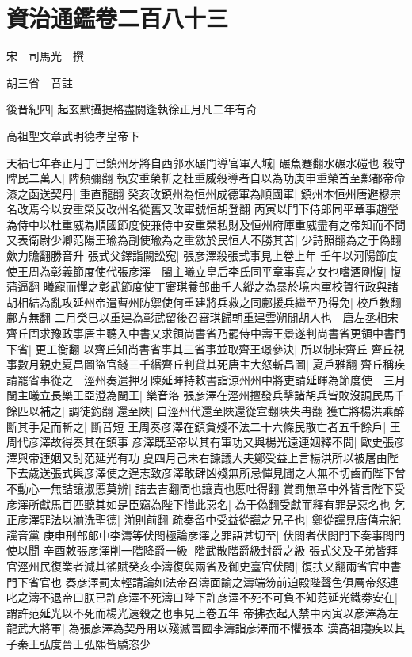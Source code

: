 \section{資治通鑑卷二百八十三}
宋　司馬光　撰

胡三省　音註

後晋紀四|{
	起玄黓攝提格盡閼逢執徐正月凡二年有奇}


高祖聖文章武明德孝皇帝下

天福七年春正月丁巳鎮州牙將自西郭水碾門導官軍入城|{
	碾魚蹇翻水碾水磑也}
殺守陴民二萬人|{
	陴頻彌翻}
執安重榮斬之杜重威殺導者自以為功庚申重榮首至鄴都帝命漆之函送契丹|{
	重直龍翻}
癸亥改鎮州為恒州成德軍為順國軍|{
	鎮州本恒州唐避穆宗名改焉今以安重榮反改州名從舊又改軍號恒胡登翻}
丙寅以門下侍郎同平章事趙瑩為侍中以杜重威為順國節度使兼侍中安重榮私財及恒州府庫重威盡有之帝知而不問又表衛尉少卿范陽王瑜為副使瑜為之重斂於民恒人不勝其苦|{
	少詩照翻為之于偽翻歛力贍翻勝音升}
張式父鐸詣闕訟寃|{
	張彦澤殺張式事見上卷上年}
壬午以河陽節度使王周為彰義節度使代張彦澤　閩主曦立皇后李氏同平章事真之女也嗜酒剛愎|{
	愎蒲逼翻}
曦寵而憚之彰武節度使丁審琪養部曲千人縱之為暴於境内軍校賀行政與諸胡相結為亂攻延州帝遣曹州防禦使何重建將兵救之同鄜援兵繼至乃得免|{
	校戶教翻鄜方無翻}
二月癸巳以重建為彰武留後召審琪歸朝重建雲朔閒胡人也　唐左丞相宋齊丘固求豫政事唐主聽入中書又求領尚書省乃罷侍中壽王景遂判尚書省更領中書門下省|{
	更工衡翻}
以齊丘知尚書省事其三省事並取齊王璟參決|{
	所以制宋齊丘}
齊丘視事數月親吏夏昌圖盜官錢三千緡齊丘判貸其死唐主大怒斬昌圖|{
	夏戶雅翻}
齊丘稱疾請罷省事從之　涇州奏遣押牙陳延暉持敕書詣涼州州中將吏請延暉為節度使　三月閩主曦立長樂王亞澄為閩王|{
	樂音洛}
張彦澤在涇州擅發兵擊諸胡兵皆敗沒調民馬千餘匹以補之|{
	調徒釣翻}
還至陜|{
	自涇州代還至陜還從宣翻陜失冉翻}
獲亡將楊洪乘醉斷其手足而斬之|{
	斷音短}
王周奏彦澤在鎮貪殘不法二十六條民散亡者五千餘戶|{
	王周代彦澤故得奏其在鎮事}
彦澤既至帝以其有軍功又與楊光遠連姻釋不問|{
	歐史張彦澤與帝連姻又討范延光有功}
夏四月己未右諫議大夫鄭受益上言楊洪所以被屠由陛下去歲送張式與彦澤使之逞志致彦澤敢肆凶殘無所忌憚見聞之人無不切齒而陛下曾不動心一無詰讓淑慝莫辨|{
	詰去吉翻問也讓責也慝吐得翻}
賞罰無章中外皆言陛下受彦澤所獻馬百匹聽其如是臣竊為陛下惜此惡名|{
	為于偽翻受獻而釋有罪是惡名也}
乞正彦澤罪法以湔洗聖德|{
	湔則前翻}
疏奏留中受益從讜之兄子也|{
	鄭從讜見唐僖宗紀讜音黨}
庚申刑部郎中李濤等伏閤極論彦澤之罪語甚切至|{
	伏閤者伏閤門下奏事閤門使以聞}
辛酉敕張彦澤削一階降爵一級|{
	階武散階爵級封爵之級}
張式父及子弟皆拜官涇州民復業者減其徭賦癸亥李濤復與兩省及御史臺官伏閤|{
	復扶又翻兩省官中書門下省官也}
奏彦澤罰太輕請論如法帝召濤面諭之濤端笏前迫殿陛聲色俱厲帝怒連叱之濤不退帝曰朕已許彦澤不死濤曰陛下許彦澤不死不可負不知范延光鐵劵安在|{
	謂許范延光以不死而楊光遠殺之也事見上卷五年}
帝拂衣起入禁中丙寅以彦澤為左龍武大將軍|{
	為張彦澤為契丹用以殘滅晉國李濤詣彦澤而不懼張本}
漢高祖寢疾以其子秦王弘度晉王弘熙皆驕恣少

